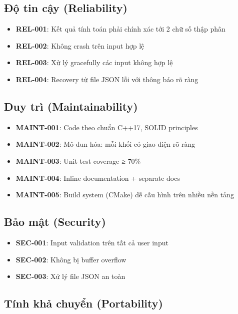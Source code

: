 \subsection{Độ tin cậy (Reliability)}

\begin{itemize}[leftmargin=1.5cm]
  \item \textbf{REL-001}: Kết quả tính toán phải chính xác tới 2 chữ số thập phân
  \item \textbf{REL-002}: Không crash trên input hợp lệ
  \item \textbf{REL-003}: Xử lý gracefully các input không hợp lệ
  \item \textbf{REL-004}: Recovery từ file JSON lỗi với thông báo rõ ràng
\end{itemize}

\subsection{Duy trì (Maintainability)}

\begin{itemize}[leftmargin=1.5cm]
  \item \textbf{MAINT-001}: Code theo chuẩn C++17, SOLID principles
  \item \textbf{MAINT-002}: Mô-đun hóa: mỗi khối có giao diện rõ ràng
  \item \textbf{MAINT-003}: Unit test coverage ≥ 70\%
  \item \textbf{MAINT-004}: Inline documentation + separate docs
  \item \textbf{MAINT-005}: Build system (CMake) dễ cấu hình trên nhiều nền tảng
\end{itemize}

\subsection{Bảo mật (Security)}

\begin{itemize}[leftmargin=1.5cm]
  \item \textbf{SEC-001}: Input validation trên tất cả user input
  \item \textbf{SEC-002}: Không bị buffer overflow
  \item \textbf{SEC-003}: Xử lý file JSON an toàn
\end{itemize}

\subsection{Tính khả chuyển (Portability)}


